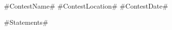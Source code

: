 \documentclass [11pt, a4paper, oneside] {article}
\begin{document}
\contest
{#ContestName#}%
{#ContestLocation#}%
{#ContestDate#}%


\renewcommand{\t}{\texttt}

#Statements#
\end{document}

